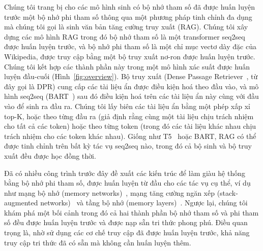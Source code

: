 \documentclass[10pt,letterpaper]{article}
\begin{document}
Chúng tôi trang bị cho các mô hình sinh có bộ nhớ tham số đã được huấn luyện
trước một bộ nhớ phi tham số thông qua một phương pháp tinh chỉnh đa dụng mà
chúng tôi gọi là sinh văn bản tăng cường truy xuất (RAG). Chúng tôi xây dựng
các mô hình RAG trong đó bộ nhớ tham số là một transformer seq2seq được huấn
luyện trước, và bộ nhớ phi tham số là một chỉ mục vectơ dày đặc của Wikipedia,
được truy cập bằng một bộ truy xuất nơ-ron được huấn luyện trước. Chúng tôi kết
hợp các thành phần này trong một mô hình xác suất được huấn luyện đầu-cuối
(Hình~\ref{fig:overview}). Bộ truy xuất (Dense Passage Retriever~\cite{b26},
từ đây gọi là DPR) cung cấp các tài liệu ẩn được điều kiện hoá theo đầu vào, và
mô hình seq2seq (BART~\cite{b32}) sau đó điều kiện hoá trên các tài liệu ẩn này
cùng với đầu vào để sinh ra đầu ra. Chúng tôi lấy biên các tài liệu ẩn bằng một
phép xấp xỉ top-K, hoặc theo từng đầu ra (giả định rằng cùng một tài liệu chịu
trách nhiệm cho tất cả các token) hoặc theo từng token (trong đó các tài liệu
khác nhau chịu trách nhiệm cho các token khác nhau). Giống như T5~\cite{b51}
hoặc BART, RAG có thể được tinh chỉnh trên bất kỳ tác vụ seq2seq nào, trong đó
cả bộ sinh và bộ truy xuất đều được học đồng thời.

Đã có nhiều công trình trước đây đề xuất các kiến trúc để làm giàu hệ thống
bằng bộ nhớ phi tham số, được huấn luyện từ đầu cho các tác vụ cụ thể, ví dụ
như mạng bộ nhớ (memory networks)~\cite{b64,b55}, mạng tăng cường ngăn xếp
(stack-augmented networks)~\cite{b25} và tầng bộ nhớ (memory
layers)~\cite{b30}. Ngược lại, chúng tôi khám phá một bối cảnh trong đó cả hai
thành phần bộ nhớ tham số và phi tham số đều được huấn luyện trước và được nạp
sẵn tri thức phong phú. Điều quan trọng là, nhờ sử dụng các cơ chế truy cập đã
được huấn luyện trước, khả năng truy cập tri thức đã có sẵn mà không cần huấn
luyện thêm.
\end{document}
